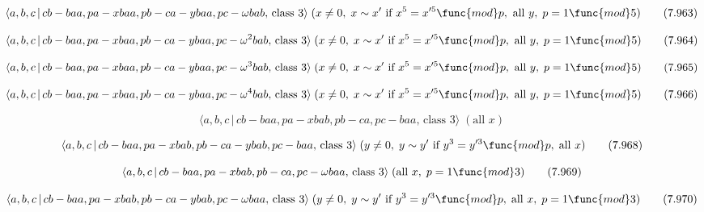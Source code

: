 \documentclass[10pt]{article}
\begin{document}
\begin{equation}
\langle a,b,c\,|\,cb-baa,pa-xbaa,pb-ca-ybaa,pc-\omega bab,\,\text{class }%
3\rangle \;(x\neq 0,\;x\sim x^{\prime }\text{ if }x^{5}=x^{\prime 5}\func{mod%
}p,\text{ all }y,\;p=1\func{mod}5)  \tag{7.963}
\end{equation}

\begin{equation}
\langle a,b,c\,|\,cb-baa,pa-xbaa,pb-ca-ybaa,pc-\omega ^{2}bab,\,\text{class }%
3\rangle \;(x\neq 0,\;x\sim x^{\prime }\text{ if }x^{5}=x^{\prime 5}\func{mod%
}p,\text{ all }y,\;p=1\func{mod}5)  \tag{7.964}
\end{equation}

\begin{equation}
\langle a,b,c\,|\,cb-baa,pa-xbaa,pb-ca-ybaa,pc-\omega ^{3}bab,\,\text{class }%
3\rangle \;(x\neq 0,\;x\sim x^{\prime }\text{ if }x^{5}=x^{\prime 5}\func{mod%
}p,\text{ all }y,\;p=1\func{mod}5)  \tag{7.965}
\end{equation}

\begin{equation}
\langle a,b,c\,|\,cb-baa,pa-xbaa,pb-ca-ybaa,pc-\omega ^{4}bab,\,\text{class }%
3\rangle \;(x\neq 0,\;x\sim x^{\prime }\text{ if }x^{5}=x^{\prime 5}\func{mod%
}p,\text{ all }y,\;p=1\func{mod}5)  \tag{7.966}
\end{equation}

\begin{equation}
\langle a,b,c\,|\,cb-baa,pa-xbab,pb-ca,pc-baa,\,\text{class }3\rangle \;(%
\text{all }x)  \tag{7.967}
\end{equation}

\begin{equation}
\langle a,b,c\,|\,cb-baa,pa-xbab,pb-ca-ybab,pc-baa,\,\text{class }3\rangle
\;(y\neq 0,\;y\sim y^{\prime }\text{ if }y^{3}=y^{\prime 3}\func{mod}p,\;%
\text{all }x)  \tag{7.968}
\end{equation}

\begin{equation}
\langle a,b,c\,|\,cb-baa,pa-xbab,pb-ca,pc-\omega baa,\,\text{class }3\rangle
\;(\text{all }x,\;p=1\func{mod}3)  \tag{7.969}
\end{equation}

\begin{equation}
\langle a,b,c\,|\,cb-baa,pa-xbab,pb-ca-ybab,pc-\omega baa,\,\text{class }%
3\rangle \;(y\neq 0,\;y\sim y^{\prime }\text{ if }y^{3}=y^{\prime 3}\func{mod%
}p,\;\text{all }x,\;p=1\func{mod}3)  \tag{7.970}
\end{equation}
\end{document}
